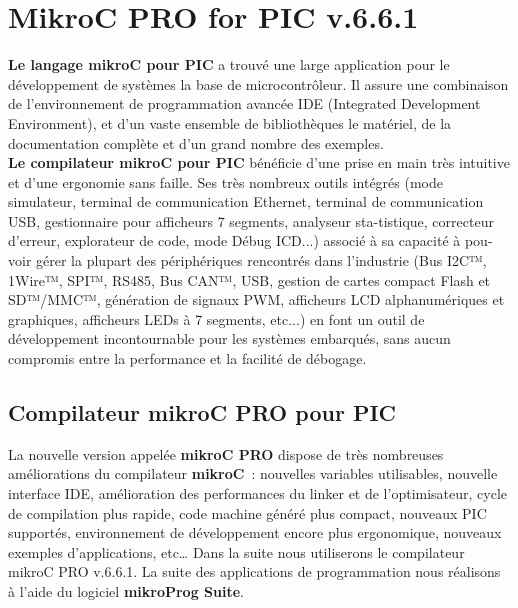 \documentclass[a4paper, 12pt]{book}
\newcounter{program}[subsection]
\begin{document}
\chapter{MikroC PRO for PIC v.6.6.1}
\textbf {Le langage mikroC pour PIC} a trouvé une large application pour le développement de systèmes la base de microcontrôleur. Il assure une combinaison de l'environnement de programmation avancée IDE (Integrated Development Environment), et d’un vaste ensemble de bibliothèques le matériel, de la documentation complète et d’un grand nombre des exemples.\\

\textbf {Le compilateur mikroC pour PIC} bénéficie d'une prise en main très intuitive et d'une ergonomie sans faille. Ses très nombreux outils intégrés (mode simulateur, terminal de communication Ethernet, terminal de communication USB, gestionnaire pour afficheurs 7 segments, analyseur sta-tistique, correcteur d'erreur, explorateur de code, mode Débug ICD...) associé à sa capacité à pou-voir gérer la plupart des périphériques rencontrés dans l'industrie (Bus I2C™, 1Wire™, 
SPI™, RS485, Bus CAN™, USB, gestion de cartes compact Flash et SD™/MMC™, génération de signaux PWM, afficheurs LCD alphanumériques et graphiques, afficheurs LEDs à 7 segments, etc...) en font un outil de développement incontournable pour les systèmes embarqués, sans aucun compromis entre la performance et la facilité de débogage.\\

\section{Compilateur mikroC PRO pour PIC}
La nouvelle version appelée \textbf{mikroC PRO} dispose de très nombreuses améliorations du compilateur \textbf{mikroC}~: nouvelles variables utilisables, nouvelle interface IDE, amélioration des performances du linker et de l’optimisateur, cycle de compilation plus rapide, code machine généré plus compact, nouveaux PIC supportés, environnement de développement encore plus ergonomique, nouveaux exemples d’applications, etc…
Dans la suite nous utiliserons le compilateur mikroC PRO v.6.6.1.
La suite des applications de programmation nous réalisons à l’aide du logiciel \textbf{mikroProg Suite}.\\
\end{document}
